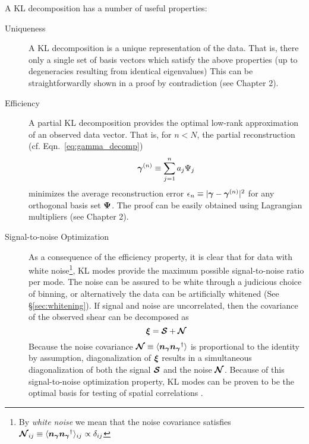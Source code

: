 A KL decomposition has a number of useful properties:
\begin{description}
  \item[Uniqueness] A KL decomposition is a unique representation of the data.
    That is, there only a single set of basis vectors which satisfy the above
    properties (up to degeneracies resulting from identical eigenvalues)
    This can be straightforwardly shown in a proof by contradiction
    (see Chapter 2).
  \item[Efficiency] A partial KL decomposition provides the
    optimal low-rank approximation of an observed data vector.  That is,
    for $n < N$, the partial reconstruction (cf. Eqn.~\ref{eq:gamma_decomp})
    \begin{equation}
      \boldsymbol{\gamma}^{(n)} \equiv \sum_{j=1}^n a_j \Psi_j
    \end{equation}
    minimizes the average reconstruction error
    $\epsilon_n \equiv |\boldsymbol{\gamma} - \boldsymbol{\gamma}^{(n)}|^2$
    for any orthogonal basis set $\boldsymbol{\Psi}$.  The proof can be easily
    obtained using Lagrangian multipliers (see Chapter 2).
  \item[Signal-to-noise Optimization] As a consequence of the efficiency
    property, it is clear that for data with white noise\footnote{
    By \textit{white noise} we mean that the noise covariance satisfies
    $\boldsymbol{\mathcal{N}}_{ij} \equiv 
    \langle\boldsymbol{n_\gamma}\boldsymbol{n_\gamma}^\dagger\rangle_{ij} 
    \propto \delta_{ij}$}, KL modes provide the
    maximum possible signal-to-noise ratio per mode.  The noise can be assured
    to be white through a judicious choice of binning, or alternatively
    the data can be artificially whitened (See \S\ref{sec:whitening}).
    If signal and noise are uncorrelated, then the covariance of the observed
    shear can be decomposed as
    \begin{equation}
      \boldsymbol{\xi} = \boldsymbol{\mathcal{S}} + \boldsymbol{\mathcal{N}}
    \end{equation}
    Because the noise covariance $\boldsymbol{\mathcal{N}} \equiv 
    \langle\boldsymbol{n_\gamma}\boldsymbol{n_\gamma}^\dagger\rangle$ is proportional
    to the identity by assumption, diagonalization of $\boldsymbol{\xi}$ results
    in a simultaneous diagonalization of both the signal $\boldsymbol{\mathcal{S}}$
    and the noise $\boldsymbol{\mathcal{N}}$.  Because of this signal-to-noise
    optimization property, KL modes can be proven to be the optimal basis
    for testing of spatial correlations \citep[see Appendix A of][]{Vogeley96}.
\end{description}

